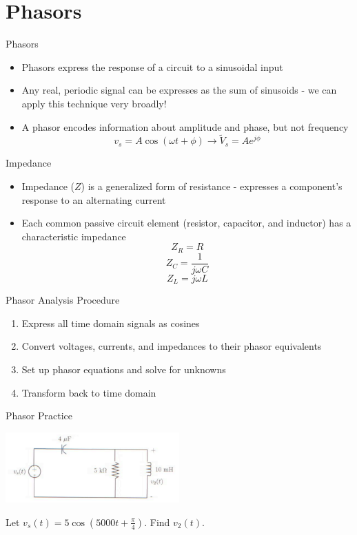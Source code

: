 
\section{Phasors}
	
    \begin{frame}{Phasors}
        \begin{itemize}
            \item Phasors express the response of a circuit to a sinusoidal input
            \item Any real, periodic signal can be expresses as the sum of sinusoids - we can apply this technique very broadly!
            \item A phasor encodes information about amplitude and phase, but not frequency
            $$v_s=A\cos(\omega t+\phi) \rightarrow \tilde{V}_s=Ae^{j\phi}$$
        \end{itemize}
    \end{frame}
    
    \begin{frame}{Impedance}
        \begin{itemize}
            \item Impedance ($Z$) is a generalized form of resistance - expresses a component's response to an alternating current
            \item Each common passive circuit element (resistor, capacitor, and inductor) has a characteristic impedance
            $$Z_R=R$$
            $$Z_C=\frac{1}{j\omega C}$$
            $$Z_L=j\omega L$$
        \end{itemize}
    \end{frame}
    
    \begin{frame}{Phasor Analysis Procedure}
        \begin{enumerate}
            \item Express all time domain signals as cosines
            \item Convert voltages, currents, and impedances to their phasor equivalents
            \item Set up phasor equations and solve for unknowns
            \item Transform back to time domain
        \end{enumerate}
    \end{frame}
    
    \begin{frame}{Phasor Practice}
        \begin{center}
            \includegraphics[width=0.5\textwidth]{./images/phasor-practice.png}
        \end{center}
        Let $v_s(t)=5\cos(5000t+\frac{\pi}{4})$. Find $v_2(t)$.
    \end{frame}


